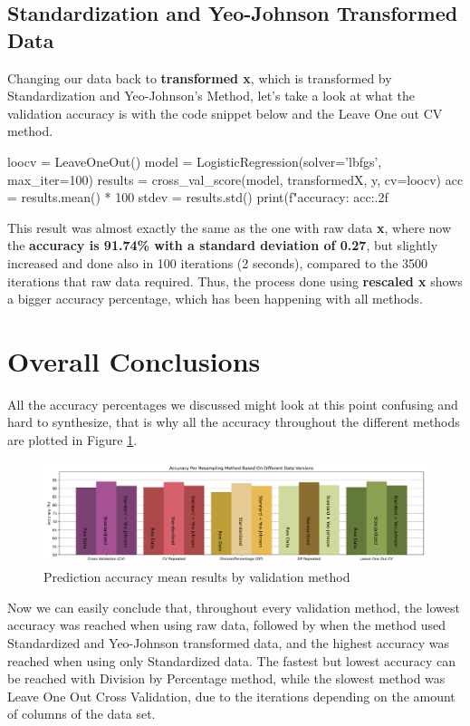 \documentclass[11pt]{article}
\begin{document}
\subsection{Standardization and Yeo-Johnson Transformed Data}

Changing our data back to \textbf{transformed x}, which is transformed by Standardization and Yeo-Johnson's Method, let's take a look at what the validation accuracy is with the code snippet below and the Leave One out CV method.
\\

\begin{python}
loocv = LeaveOneOut()
model = LogisticRegression(solver='lbfgs', max_iter=100)
results = cross_val_score(model, transformedX, y, cv=loocv)
acc = results.mean() * 100
stdev = results.std()
print(f"accuracy: {acc:.2f}%
\end{python}

This result was almost exactly the same as the one with raw data \textbf{x}, where now the \textbf{accuracy is  91.74\% with a standard deviation of 0.27}, but slightly increased and done also in 100 iterations (2 seconds), compared to the 3500 iterations that raw data required. Thus, the process done using \textbf{rescaled x} shows a bigger accuracy percentage, which has been happening with all methods.

\section{Overall Conclusions}

All the accuracy percentages we discussed might look at this point confusing and hard to synthesize, that is why all the accuracy throughout the different methods are plotted in Figure \ref{fig:bars}.

\begin{figure}[!ht]
\centering
    \includegraphics[width=7in]{acc-plot2.png}
    \caption{Prediction accuracy mean results by validation method}
    \label{fig:bars}
\end{figure}

Now we can easily conclude that, throughout every validation method, the lowest accuracy was reached when using raw data, followed by when the method used Standardized and Yeo-Johnson transformed data, and the highest accuracy was reached when using only Standardized data. The fastest but lowest accuracy can be reached with Division by Percentage method, while the slowest method was Leave One Out Cross Validation, due to the iterations depending on the amount of columns of the data set.
\\
\end{document}
